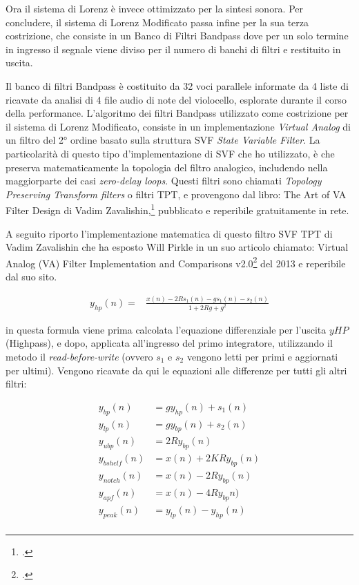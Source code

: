 Ora il sistema di Lorenz è invece ottimizzato per la sintesi sonora.
Per concludere, il sistema di Lorenz Modificato passa infine per la sua terza costrizione,
che consiste in un Banco di Filtri Bandpass dove per un solo termine in ingresso 
il segnale viene diviso per il numero di banchi di filtri e restituito in uscita. 

Il banco di filtri Bandpass è costituito da 32 voci parallele informate da 
4 liste di ricavate da analisi di 4 file audio di note del violocello,
esplorate durante il corso della performance.
L'algoritmo dei filtri Bandpass utilizzato come costrizione per il sistema
di Lorenz Modificato, consiste in un implementazione \textit{Virtual Analog} 
di un filtro del 2° ordine basato sulla struttura SVF \textit{State Variable Filter}.
La particolarità di questo tipo d'implementazione di SVF che ho utilizzato,
è che preserva matematicamente la topologia del filtro analogico,
includendo nella maggiorparte dei casi \textit{zero-delay loops}.
Questi filtri sono chiamati \textit{Topology Preserving Transform filters} o filtri TPT,
e provengono dal libro: The Art of VA Filter Design di Vadim Zavalishin,\footcite{Zavalishin_VA_filter_design}
pubblicato e reperibile gratuitamente in rete. 

A seguito riporto l'implementazione matematica di questo filtro SVF TPT di Vadim Zavalishin
che ha esposto Will Pirkle in un suo articolo chiamato: 
Virtual Analog (VA) Filter Implementation and Comparisons v2.0\footcite{Pirkle_VA_filter_design}
del 2013 e reperibile dal suo sito.

\begin{align*}
    y_{hp}(n) = & \frac{x(n)- 2Rs_{1}(n) - gs_{1}(n) - s_{2}(n)}
    {1 + 2Rg + g^{2}}
\end{align*}

in questa formula viene prima calcolata l'equazione 
differenziale per l'uscita \( yHP \) (Highpass),
e dopo, applicata all'ingresso del primo integratore, 
utilizzando il metodo il \textit{read-before-write}
(ovvero \( s_{1} \) e \( s_{2} \) vengono letti per primi e aggiornati per ultimi). 
Vengono ricavate da qui le equazioni alle differenze per tutti gli altri filtri:

\begin{align*}
{y_{bp}(n)}& =  gy_{hp}(n) + s_{1}(n) \\
{y_{lp}(n)}& =  gy_{bp}(n) + s_{2}(n) \\
{y_{ubp}(n)}& =  2Ry_{bp}(n) \\
{y_{bshelf}(n)}& =  x(n) + 2KRy_{bp}(n) \\
{y_{notch}(n)}& =  x(n) - 2Ry_{bp}(n) \\
{y_{apf}(n)}& =  x(n) - 4Ry_{bp}n) \\
{y_{peak}(n)}& =  y_{lp}(n) - y_{hp}(n) \\
\end{align*}

